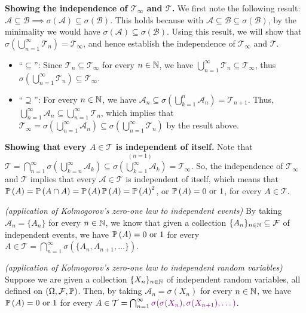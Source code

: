 \begin{enumerate}
\begin{pf}
\textbf{Showing the independence of \(\mathcal{T}_{\infty}\) and
\(\mathcal{T}\).} We first note the following result: \(\mathcal{A}\subseteq
\mathcal{B}\implies \sigma(\mathcal{A})\subseteq \sigma(\mathcal{B})\). This
holds because with \(\mathcal{A}\subseteq \mathcal{B}\subseteq
\sigma(\mathcal{B})\), by the minimality we would have
\(\sigma(\mathcal{A})\subseteq \sigma(\mathcal{B})\). Using this result, we will
show that \(\sigma(\bigcup_{n=1}^{\infty}\mathcal{T}_n)=\mathcal{T}_{\infty}\),
and hence establish the independence of \(\mathcal{T}_{\infty}\) and
\(\mathcal{T}\).
\begin{itemize}
\item ``\(\subseteq\)'': Since \(\mathcal{T}_n\subseteq \mathcal{T}_{\infty}\) for every \(n\in\mathbb{N}\),
we have \(\bigcup_{n=1}^{\infty}\mathcal{T}_n\subseteq \mathcal{T}_{\infty}\), thus
\(\sigma(\bigcup_{n=1}^{\infty}\mathcal{T}_n)\subseteq \mathcal{T}_{\infty}\).
\item ``\(\supseteq\)'': For every \(n\in\mathbb{N}\), we have \(\mathcal{A}_n\subseteq
\sigma(\bigcup_{k=1}^{n}\mathcal{A}_n)=\mathcal{T}_{n+1}\). Thus,
\(\bigcup_{n=1}^{\infty}\mathcal{A}_n\subseteq
\bigcup_{n=1}^{\infty}\mathcal{T}_{n}\), which implies that
\(\mathcal{T}_{\infty}=\sigma(\bigcup_{n=1}^{\infty}\mathcal{A}_n) \subseteq
\sigma(\bigcup_{n=1}^{\infty}\mathcal{T}_n)\) by the result above.
\end{itemize}
\textbf{Showing that every \(A\in\mathcal{T}\) is independent of itself.}
Note that \(\mathcal{T}=\bigcap_{n=1}^{\infty}\sigma(\bigcup_{k=n}^{\infty}\mathcal{A}_k)
\subseteq \overset{(n=1)}{\sigma(\bigcup_{k=1}^{\infty}\mathcal{A}_k)}
=\mathcal{T}_{\infty}\). So, the independence of \(\mathcal{T}_{\infty}\) and
\(\mathcal{T}\) implies that every \(\mathcal{A}\in\mathcal{T}\) is independent of itself,
which means that \(\mathbb{P}\left(A\right)=\mathbb{P}\left(A\cap A\right)=\mathbb{P}\left(A\right)\mathbb{P}\left(A\right)=\mathbb{P}\left(A\right)^{2}\), or
\(\mathbb{P}\left(A\right)=0\text{ or }1\), for every \(A\in\mathcal{T}\).
\end{pf}
\begin{remark}
\item \emph{(application of Kolmogorov's zero-one law to independent events)}
By taking \(\mathcal{A}_n=\{A_n\}\) for every \(n\in\mathbb{N}\), we know that given a
collection \(\{A_n\}_{n\in\mathbb{N}}\subseteq \mathcal{F}\) of independent events, we have
\(\mathbb{P}\left(A\right)=0\text{ or }1\) for every \(A\in\mathcal{T}=\bigcap_{n=1}^{\infty}\sigma(\{A_n,A_{n+1},\dotsc\})\).
\item \emph{(application of Kolmogorov's zero-one law to independent random
variables)} Suppose we are given a collection \(\{X_n\}_{n\in\mathbb{N}}\) of
independent random variables, all defined on \((\Omega,\mathcal{F},\mathbb{P})\).
Then, by taking \(\mathcal{A}_n=\sigma(X_n)\) for every \(n\in\mathbb{N}\), we have
\(\mathbb{P}\left(A\right)=0\text{ or }1\) for every
\(A\in\mathcal{T}=\bigcap_{n=1}^{\infty}\vc{\sigma(\sigma(X_n),\sigma(X_{n+1}),\dotsc)}\).


\end{remark}
\end{enumerate}

